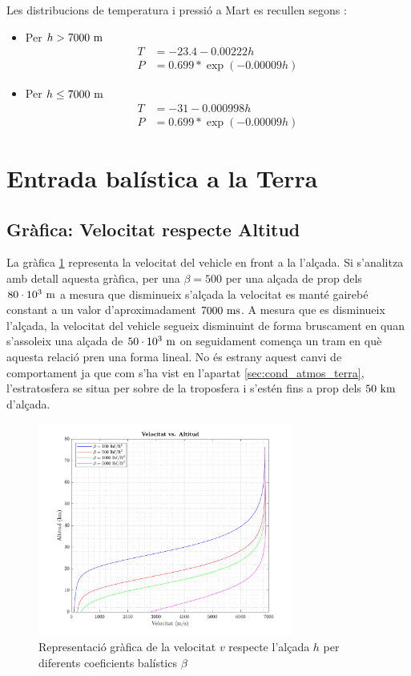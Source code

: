 Les distribucions de temperatura i pressió a Mart es recullen segons \cite{nasa_mars_info}:
\begin{itemize}
    \item Per $h > 7000 \ \meter$
    \begin{align*}
        T &= -23.4 - 0.00222 h \\
        P &= 0.699 * \exp{\left( -0.00009 h \right)}
    \end{align*}
    \item Per $h \leq 7000 \ \meter$
    \begin{align*}
        T &= -31 - 0.000998 h \\
        P &= 0.699 * \exp{\left( -0.00009 h \right)}
    \end{align*}
\end{itemize}

\newpage
\section{Entrada balística a la Terra}
\subsection{Gràfica: Velocitat respecte Altitud}

La gràfica \ref{fig:velocitat} representa la velocitat del vehicle en front a la l'alçada. Si s'analitza amb detall aquesta gràfica, per una $\beta=500$ per una alçada de prop dels $80 \cdot 10^3 \ \meter$ a mesura que disminueix s'alçada la velocitat es manté gairebé constant a un valor d'aproximadament $7000 \ \meter\second$. A mesura que es disminueix l'alçada, la velocitat del vehicle segueix disminuint de forma bruscament en quan s'assoleix una alçada de $50 \cdot 10^3 \ \meter$ on seguidament comença un tram en què aquesta relació pren una forma lineal. No és estrany aquest canvi de comportament ja que com s'ha vist en l'apartat \ref{sec:cond_atmos_terra}, l'estratosfera se situa per sobre de la troposfera i s'estén fins a prop dels $50 \ \kilo\meter$ d'alçada. 

\begin{figure}[ht]
    \centering
    \includegraphics[width=0.75\textwidth]{imagenes/01_ballistic_graficas/velocitat.pdf}
    \caption{Representació gràfica de la velocitat $v$ respecte l'alçada $h$ per diferents coeficients balístics $\beta$}
    \label{fig:velocitat}
\end{figure}

